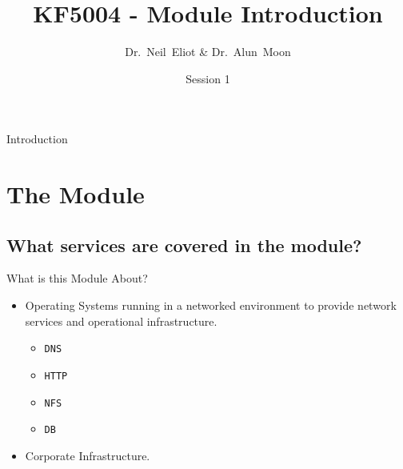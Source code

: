 \documentclass{beamer}
\title{KF5004 - Module Introduction}
\author{Dr.~Neil~Eliot \& Dr.~Alun~Moon}
\institute[Northumbria University] %
{
  Department of Computer and Information Sciences\\
  University of Northumbria
}
\date{Session 1}
\begin{document}
\begin{frame}
  \titlepage
\end{frame}

\begin{frame}{Introduction}
  \tableofcontents
\end{frame}


\section{The Module}
\subsection{What services are covered in the module?}
\begin{frame}{What is this Module About?}
  \begin{itemize}
    \item Operating Systems running in a networked environment to provide network services and operational infrastructure.
    \begin{itemize}
      \item \texttt{DNS}
      \item \texttt{HTTP}
      \item \texttt{NFS}
      \item \texttt{DB}
    \end{itemize}
    \item Corporate Infrastructure.
  \end{itemize}
\end{frame}
\end{document}

